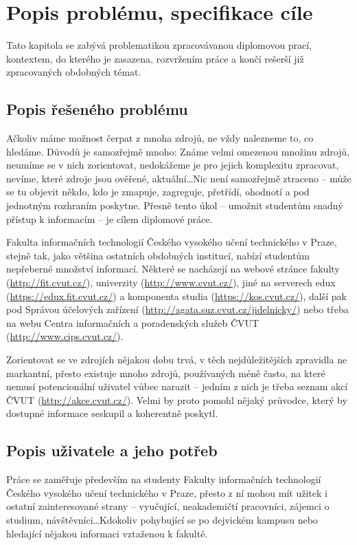
\chapter{Popis problému, specifikace cíle}
Tato kapitola se zabývá problematikou zpracovávanou diplomovou prací, kontextem, do kterého je zasazena, rozvržením práce a končí rešerší již zpracovaných obdobných témat.

\section{Popis řešeného problému}
Ačkoliv máme možnost čerpat z mnoha zdrojů, ne vždy nalezneme to, co hledáme. Důvodů je samozřejmě mnoho: Známe velmi omezenou množinu zdrojů, neumíme se v nich zorientovat, nedokážeme je pro jejich komplexitu zpracovat, nevíme, které zdroje jsou ověřené, aktuální\dots Nic není samozřejmě ztraceno -- může se tu objevit někdo, kdo je zmapuje, zagreguje, přetřídí, ohodnotí a pod jednotným rozhraním poskytne. Přesně tento úkol -- umožnit studentům snadný přístup k informacím -- je cílem diplomové práce.

Fakulta informačních technologií Českého vysokého učení technického v Praze, stejně tak, jako většina ostatních obdobných institucí, nabízí studentům nepřeberné množství informací. Některé se nacházejí na webové stránce fakulty (\url{http://fit.cvut.cz/}), univerzity (\url{http://www.cvut.cz/}), jiné na serverech edux (\url{https://edux.fit.cvut.cz/}) a komponenta studia (\url{https://kos.cvut.cz/}), další pak pod Správou účelových zařízení (\url{http://agata.suz.cvut.cz/jidelnicky/}) nebo třeba na webu Centra informačních a poradenských služeb ČVUT (\url{http://www.cips.cvut.cz/}).

Zorientovat se ve zdrojích nějakou dobu trvá, v těch nejdůležitějších zpravidla ne markantní, přesto existuje mnoho zdrojů, používaných méně často, na které nemusí potencionální uživatel vůbec narazit -- jedním z nich je třeba seznam akcí ČVUT (\url{http://akce.cvut.cz/}). Velmi by proto pomohl nějaký průvodce, který by dostupné informace seskupil a koherentně poskytl.

\section{Popis uživatele a jeho potřeb}
Práce se zaměřuje především na studenty Fakulty informačních technologií Českého vysokého učení technického v Praze, přesto z ní mohou mít užitek i ostatní zainteresované strany -- vyučující, neakademičtí pracovníci, zájemci o studium, návštěvníci\dots Kdokoliv pohybující se po dejvickém kampusu nebo hledající nějakou informaci vztaženou k fakultě.


